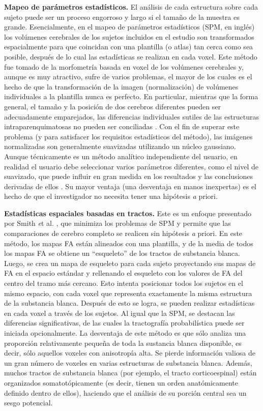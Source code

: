 \textbf{Mapeo de parámetros estadísticos.} El análisis de cada estructura sobre cada sujeto puede ser un proceso engorroso y largo si el tamaño de la muestra es grande. Esencialmente, en el mapeo de parámetros estadísticos (SPM, en inglés) los volúmenes cerebrales de los sujetos incluidos en el estudio son transformados espacialmente para que coincidan con una plantilla (o atlas) tan cerca como sea posible, después de lo cual las estadísticas se realizan en cada voxel. Este método fue tomado de la morfometría basada en voxel de los volúmenes cerebrales \cite{Wright_1995,Ashburner_2001} y, aunque es muy atractivo, sufre de varios problemas, el mayor de los cuales es el hecho de que la transformación de la imagen (normalización) de volúmenes individuales a la plantilla nunca es perfecto. En particular, mientras que la forma general, el tamaño y la posición de dos cerebros diferentes pueden ser adecuadamente emparejados, las diferencias individuales sutiles de las estructuras intraparenquimatosas no pueden ser conciliadas \cite{Ashburner_2001}. Con el fin de superar este problema (y para satisfacer los requisitos estadísticos del método), las imágenes normalizadas son generalmente suavizadas utilizando un núcleo gaussiano. Aunque técnicamente es un método analítico independiente del usuario, en realidad el usuario debe seleccionar varios parámetros diferentes, como el nivel de suavizado, que puede influir en gran medida en los resultados y las conclusiones derivadas de ellos \cite{Jones_2005,Jones_2007}. Su mayor ventaja (una desventaja en manos inexpertas) es el hecho de que el investigador no necesita tener una hipótesis {\emph a priori}.

\textbf{Estadísticas espaciales basadas en tractos.} Este es un  enfoque presentado  por Smith {\emph et al}. \cite{Smith_2006}, que minimiza los problemas de SPM y permite que las comparaciones de cerebro completo se realicen sin hipótesis {\emph a priori}. En este método, los mapas FA están alineados con una plantilla, y de la media de todos los mapas FA se obtiene un ``esqueleto'' de los tractos de substancia blanca. Luego, se crea un mapa de esqueleto para cada sujeto proyectando sus mapas de FA en el espacio estándar y rellenando el esqueleto con los valores de FA del centro del tramo más cercano. Esto intenta posicionar todos los sujetos en el mismo espacio, con cada voxel que representa exactamente la misma estructura de la substancia blanca. Después de esto se logra, se pueden realizar estadísticas en cada voxel a través de los sujetos. Al igual que la SPM, se destacan las diferencias significativas, de las cuales la tractografía probabilística puede ser iniciada opcionalmente. La desventaja de este método es que sólo analiza una proporción relativamente pequeña de toda la sustancia blanca disponible, es decir, sólo aquellos voxeles con anisotropía alta. Se pierde información valiosa de un gran número de voxeles en varias estructuras de substancia blanca. Además, muchos tractos de substancia blanca (por ejemplo, el tracto corticoespinal) están organizados somatotópicamente (es decir, tienen un orden anatómicamente definido dentro de ellos), haciendo que el análisis de su porción central sea un sesgo potencial.

